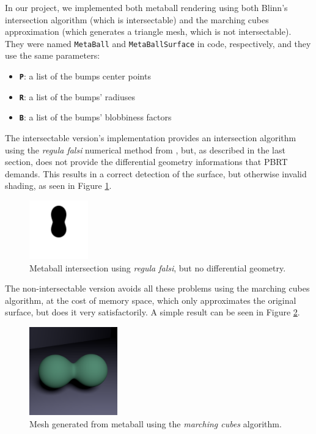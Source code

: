 \documentclass[conference]{acmsiggraph}
\begin{document}
In our project, we implemented both metaball rendering using both Blinn's
intersection algorithm (which is intersectable) and the marching cubes
approximation (which generates a triangle mesh, which is not intersectable).
They were named \texttt{MetaBall} and \texttt{MetaBallSurface} in code,
respectively, and they use the same parameters:

\begin{itemize}
  \item \textbf{\texttt{P}}: a list of the bumps center points
  \item \textbf{\texttt{R}}: a list of the bumps' radiuses
  \item \textbf{\texttt{B}}: a list of the bumps' blobbiness factors
\end{itemize}

The intersectable version's implementation provides an intersection algorithm
using the \textit{regula falsi} numerical method from
\cite{Blinn:1982:GAS:965145.801290}, but, as described in the last section, does
not provide the differential geometry informations that PBRT demands. This
results in a correct detection of the surface, but otherwise invalid shading, as
seen in Figure \ref{img:regula-falsi}.

\begin{figure}[ht]
  \centering
  \includegraphics[width=1in]{images/intersection-black.png}
  \caption{Metaball intersection using \textit{regula falsi}, but no differential geometry.}
  \label{img:regula-falsi}
\end{figure}

The non-intersectable version avoids all these problems using the marching cubes
algorithm, at the cost of memory space, which only approximates the original
surface, but does it very satisfactorily. A simple result can be seen in Figure
\ref{img:marching-cubes}.

\begin{figure}[ht]
  \centering
  \includegraphics[width=1.5in]{images/metaball-good1.png}
  \caption{Mesh generated from metaball using the \textit{marching cubes} algorithm.}
  \label{img:marching-cubes}
\end{figure}
\end{document}
